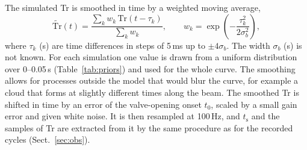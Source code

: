 \documentclass[preprint,review,12pt,authoryear]{elsarticle}
\begin{document}
The simulated Tr is smoothed in time by a weighted moving average,
\begin{equation}
\widetilde{\mathrm{Tr}}(t) = \frac{\sum_k w_k\,\mathrm{Tr}(t - \tau_k)}{\sum_k w_k},\qquad
w_k = \exp\!\left(-\frac{\tau_k^2}{2\sigma_b^2}\right),
\label{eq:smoothing}
\end{equation}
where $\tau_k$ (s) are time differences in steps of 5\,ms up to $\pm4\sigma_b$. The width $\sigma_b$ (s) is
not known. For each simulation one value is drawn from a uniform distribution over 0--0.05\,s
(Table~\ref{tab:priors}) and used for the whole curve.
The smoothing allows for processes outside the model that would blur the curve, for example a cloud that
forms at slightly different times along the beam. The smoothed Tr is shifted in time by an error of the
valve-opening onset $t_0$, scaled by a small gain error and given white noise.
It is then resampled at 100\,Hz, and $t_\mathrm{s}$ and the samples of Tr are extracted from it by the
same procedure as for the recorded cycles (Sect.~\ref{sec:obs}).
\end{document}
